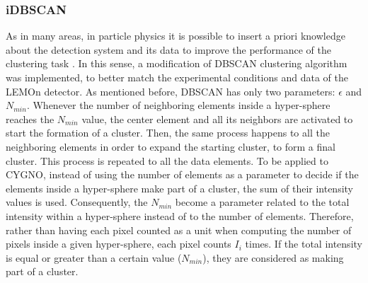 \documentclass[a4paper,11pt]{article}
\begin{document}
\subsubsection{iDBSCAN}

As in many areas, in particle physics it is possible to insert a priori knowledge about the detection system and its data to improve the performance of the clustering task \cite{wagstaff2000clustering}. In this sense, a modification of DBSCAN \cite{scikit-learn} clustering algorithm was implemented, to better match the experimental conditions and data of the LEMOn detector.
As mentioned before, DBSCAN has only two parameters: $\epsilon$ and $N_{min}$. Whenever the number of neighboring elements inside a hyper-sphere reaches the $N_{min}$ value, the center element and all its neighbors are activated to start the formation of a cluster.
Then, the same process happens to all the neighboring elements in order to expand the starting cluster, to form a final cluster. This process is repeated to all the data elements.
To be applied to CYGNO, instead of using the number of elements as a parameter to decide if the elements inside a hyper-sphere make part of a cluster, the sum of their intensity values is used. Consequently, the $N_{min}$ become a parameter related to the total intensity within a hyper-sphere instead of to the number of elements.
Therefore, rather than having each pixel counted as a unit when computing the number of pixels inside a given hyper-sphere, each pixel counts $I_i$ times.
If the total intensity is equal or greater than a certain value ($N_{min}$), they are considered as making part of a cluster.


\end{document}
